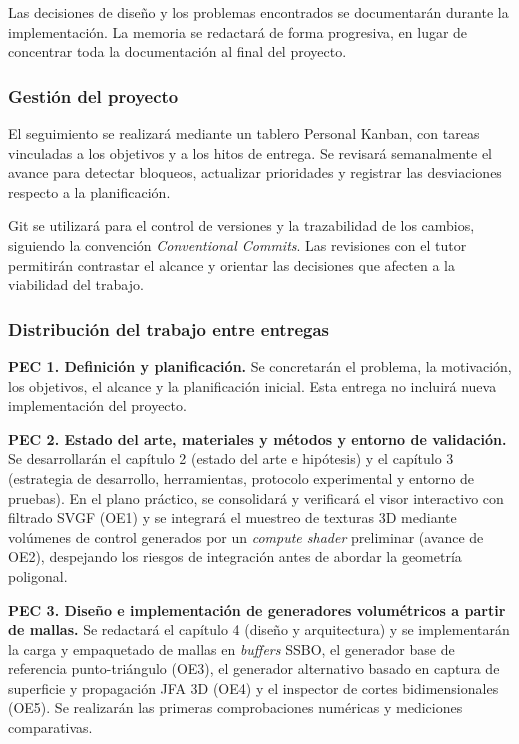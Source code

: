 Las decisiones de diseño y los problemas encontrados se documentarán durante la implementación. La memoria se redactará de forma progresiva, en lugar de concentrar toda la documentación al final del proyecto.

\subsubsection{Gestión del proyecto}

El seguimiento se realizará mediante un tablero Personal Kanban, con tareas vinculadas a los objetivos y a los hitos de entrega. Se revisará semanalmente el avance para detectar bloqueos, actualizar prioridades y registrar las desviaciones respecto a la planificación.

Git se utilizará para el control de versiones y la trazabilidad de los cambios, siguiendo la convención \textit{Conventional Commits}. Las revisiones con el tutor permitirán contrastar el alcance y orientar las decisiones que afecten a la viabilidad del trabajo.

\subsubsection{Distribución del trabajo entre entregas}

\textbf{PEC 1. Definición y planificación.} Se concretarán el problema, la motivación, los objetivos, el alcance y la planificación inicial. Esta entrega no incluirá nueva implementación del proyecto.

\textbf{PEC 2. Estado del arte, materiales y métodos y entorno de validación.} Se desarrollarán el capítulo 2 (estado del arte e hipótesis) y el capítulo 3 (estrategia de desarrollo, herramientas, protocolo experimental y entorno de pruebas). En el plano práctico, se consolidará y verificará el visor interactivo con filtrado SVGF (OE1) y se integrará el muestreo de texturas 3D mediante volúmenes de control generados por un \textit{compute shader} preliminar (avance de OE2), despejando los riesgos de integración antes de abordar la geometría poligonal.

\textbf{PEC 3. Diseño e implementación de generadores volumétricos a partir de mallas.} Se redactará el capítulo 4 (diseño y arquitectura) y se implementarán la carga y empaquetado de mallas en \textit{buffers} SSBO, el generador base de referencia punto-triángulo (OE3), el generador alternativo basado en captura de superficie y propagación JFA 3D (OE4) y el inspector de cortes bidimensionales (OE5). Se realizarán las primeras comprobaciones numéricas y mediciones comparativas.

